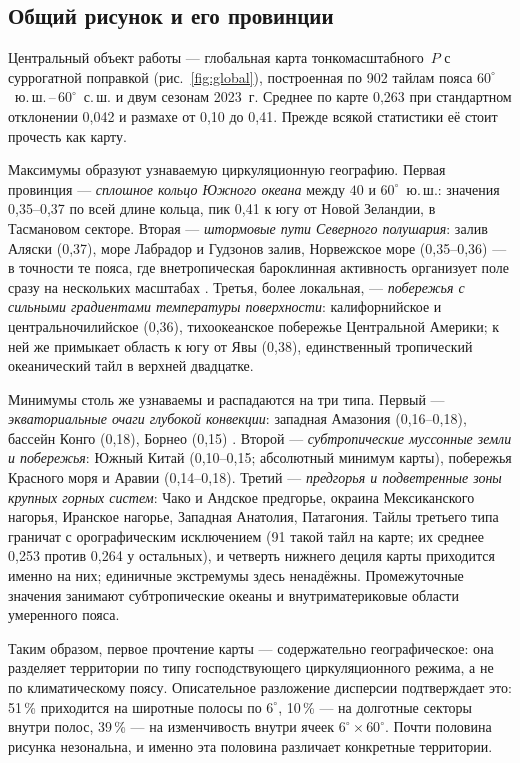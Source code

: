 \documentclass[11pt,a4paper]{article}
\begin{document}
\subsection{Общий рисунок и его провинции}
\label{sec:map}

Центральный объект работы --- глобальная карта тонкомасштабного~$P$ с суррогатной поправкой (рис.~\ref{fig:global}), построенная по 902 тайлам пояса $60^\circ$~ю.\,ш.\,--\,$60^\circ$~с.\,ш. и двум сезонам 2023~г. Среднее по карте 0,263 при стандартном отклонении 0,042 и размахе от 0,10 до 0,41. Прежде всякой статистики её стоит прочесть как карту.

Максимумы образуют узнаваемую циркуляционную географию. Первая провинция --- \emph{сплошное кольцо Южного океана} между $40$ и $60^\circ$~ю.\,ш.: значения 0,35--0,37 по всей длине кольца, пик 0,41 к югу от Новой Зеландии, в Тасмановом секторе. Вторая --- \emph{штормовые пути Северного полушария}: залив Аляски (0,37), море Лабрадор и Гудзонов залив, Норвежское море (0,35--0,36) --- в точности те пояса, где внетропическая бароклинная активность организует поле сразу на нескольких масштабах \cite{HoskinsValdes1990,Chang2002,HoskinsHodges2005,Shaw2016}. Третья, более локальная, --- \emph{побережья с сильными градиентами температуры поверхности}: калифорнийское и центральночилийское (0,36), тихоокеанское побережье Центральной Америки; к ней же примыкает область к югу от Явы (0,38), единственный тропический океанический тайл в верхней двадцатке.

Минимумы столь же узнаваемы и распадаются на три типа. Первый --- \emph{экваториальные очаги глубокой конвекции}: западная Амазония (0,16--0,18), бассейн Конго (0,18), Борнео (0,15) \cite{NealeSlingo2003,Feng2021}. Второй --- \emph{субтропические муссонные земли и побережья}: Южный Китай (0,10--0,15; абсолютный минимум карты), побережья Красного моря и Аравии (0,14--0,18). Третий --- \emph{предгорья и подветренные зоны крупных горных систем}: Чако и Андское предгорье, окраина Мексиканского нагорья, Иранское нагорье, Западная Анатолия, Патагония. Тайлы третьего типа граничат с орографическим исключением (91 такой тайл на карте; их среднее 0,253 против 0,264 у остальных), и четверть нижнего дециля карты приходится именно на них; единичные экстремумы здесь ненадёжны. Промежуточные значения занимают субтропические океаны и внутриматериковые области умеренного пояса.

Таким образом, первое прочтение карты --- содержательно географическое: она разделяет территории по типу господствующего циркуляционного режима, а не по климатическому поясу. Описательное разложение дисперсии подтверждает это: 51\,\% приходится на широтные полосы по $6^\circ$, 10\,\% --- на долготные секторы внутри полос, 39\,\% --- на изменчивость внутри ячеек $6^\circ\times60^\circ$. Почти половина рисунка незональна, и именно эта половина различает конкретные территории.
\end{document}
